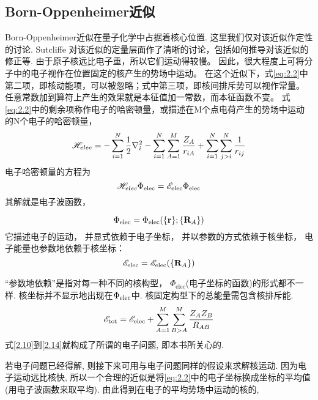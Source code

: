 \subsection{Born-Oppenheimer近似}
\label{sec2.1.2}
Born-Oppenheimer近似在量子化学中占据着核心位置.
这里我们仅对该近似作定性的讨论. Sutcliffe
对该近似的定量层面作了清晰的讨论，包括如何推导对该近似的修正等. 
由于原子核远比电子重，所以它们运动得较慢。
因此，很大程度上可将分子中的电子视作在位置固定的核产生的势场中运动。
在这个近似下，式\eqref{eq:2.2}中第二项，即核动能项，可以被忽略；式中第三项，即核间排斥势可以视作常量。
任意常数加到算符上产生的效果就是本征值加一常数，而本征函数不变。
式\eqref{eq:2.2}中的剩余项称作电子的哈密顿量，或描述在M个点电荷产生的势场中运动的N个电子的哈密顿量，
\begin{equation}
\label{2.10}
\mathscr{H}_{elec}=-\sum_{i=1}^{N}\frac{1}{2}\nabla_i^2 - \sum_{i=1}^{N}\sum_{A=1}^{M}\frac{Z_A}{r_{iA}} + \sum_{i=1}^{N}\sum_{j>i}^{N}\frac{1}{r_{ij}}
\end{equation}
电子哈密顿量的\sch 方程为
\begin{equation}
\label{2.11}
\mathscr{H}_{elec\rm}\Phi_{\rm elec}=\mathscr{E}_{\rm elec}\Phi_{\rm elec}
\end{equation}
其解就是电子波函数，

\begin{equation}
\label{2.12}
\Phi_{\rm elec}=\Phi_{\rm elec}(\{\mathbf{r}\};\{\mathbf{R}_A\})
\end{equation}
它描述电子的运动，
并显式依赖于电子坐标，
并以参数的方式依赖于核坐标，
电子能量也参数地依赖于核坐标：
\begin{equation}
\label{2.13}
\mathscr{E}_{\rm elec}=\mathscr{E}_{\rm elec}(\{\mathbf{R}_A\})
\end{equation}

“参数地依赖”是指对每一种不同的核构型，
$\Phi_\mathrm{elec}$(电子坐标的函数)的形式都不一样. 
核坐标并不显示地出现在$\Phi_{\rm elec}$中. 
核固定构型下的总能量需包含核排斥能.
\begin{equation}
\label{2.14}
\mathscr{E}_{\rm tot}=\mathscr{E}_{\rm elec}+\sum_{A=1}^{M}\sum_{B>A}^M\frac{Z_AZ_B}{R_{AB}}
\end{equation}
式\ref{2.10}到\ref{2.14}就构成了所谓的电子问题, 
即本书所关心的.


若电子问题已经得解, 
则接下来可用与电子问题同样的假设来求解核运动. 
因为电子运动远比核快, 
所以一个合理的近似是将\eqref{eq:2.2}中的电子坐标换成坐标的平均值(用电子波函数来取平均). 
由此得到在电子的平均势场中运动的核的\ha,


